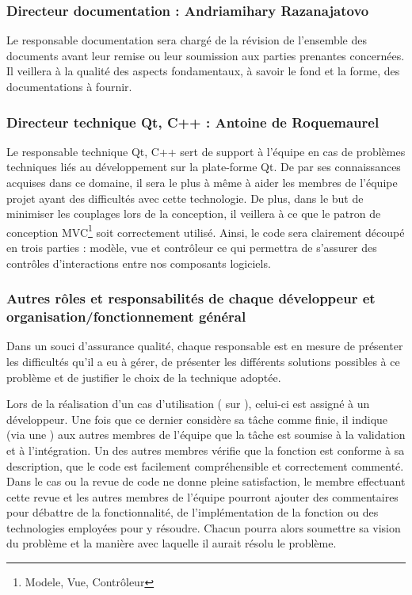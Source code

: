 \subsubsection{Directeur documentation : Andriamihary Razanajatovo}
Le responsable documentation sera chargé de la révision de l'ensemble des documents avant leur remise ou leur soumission aux parties prenantes
concernées. Il veillera à la qualité des aspects fondamentaux, à savoir le fond et la forme, des documentations à fournir.

\subsubsection{Directeur technique Qt, C++ : Antoine de Roquemaurel}
Le responsable technique Qt, C++ sert de support à l'équipe en cas de problèmes techniques liés au développement sur la plate-forme Qt. De par ses
connaissances acquises dans ce domaine, il sera le plus à même à aider les membres de l'équipe projet ayant des difficultés avec cette technologie.
De plus, dans le but de minimiser les couplages lors de la conception, il veillera à ce que le patron de conception MVC\footnote{Modele, Vue, Contrôleur} soit correctement utilisé. Ainsi, le code
sera clairement découpé en trois parties : modèle, vue et contrôleur ce qui permettra de s’assurer des contrôles d'interactions entre nos composants
logiciels.

\subsubsection{Autres rôles et responsabilités de chaque développeur et organisation/fonctionnement général}
Dans un souci d’assurance qualité, chaque responsable est en mesure de présenter les difficultés qu'il a eu à gérer, de présenter les différents
solutions possibles à ce problème et de justifier le choix de la technique adoptée.

Lors de la réalisation d’un cas d’utilisation ( sur ), celui-ci est assigné à un développeur. Une fois que ce dernier considère sa
tâche comme finie, il indique (via une ) aux autres membres de l’équipe que la tâche est soumise à la validation et à l'intégration.
Un des autres membres vérifie que la fonction est conforme à sa description, que le code est facilement compréhensible et correctement commenté. Dans
le cas ou la revue de code ne donne pleine satisfaction, le membre effectuant cette revue et les autres membres de l’équipe pourront ajouter des
commentaires pour débattre de la fonctionnalité, de l’implémentation de la fonction ou des technologies employées pour y résoudre. Chacun pourra
alors soumettre sa vision du problème et la manière avec laquelle il aurait résolu le problème. 

